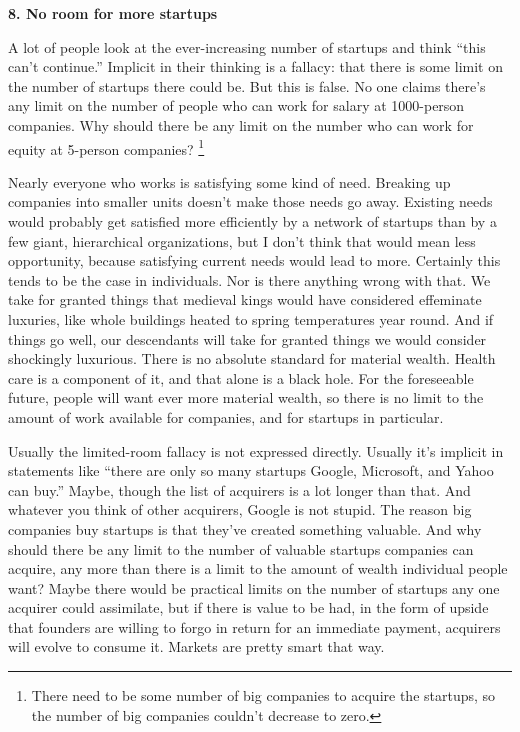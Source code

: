 \documentclass[12pt]{book}
\begin{document}
\textbf{8. No room for more startups}

A lot of people look at the ever-increasing number of startups and think
``this can't continue.'' Implicit in their thinking is a fallacy: that
there is some limit on the number of startups there could be. But this
is false. No one claims there's any limit on the number of people who
can work for salary at 1000-person companies. Why should there be any
limit on the number who can work for equity at 5-person companies?
\footnote{There need to be some number of big companies to acquire the
startups, so the number of big companies couldn't decrease to zero.}

Nearly everyone who works is satisfying some kind of need. Breaking up
companies into smaller units doesn't make those needs go away. Existing
needs would probably get satisfied more efficiently by a network of
startups than by a few giant, hierarchical organizations, but I don't
think that would mean less opportunity, because satisfying current needs
would lead to more. Certainly this tends to be the case in individuals.
Nor is there anything wrong with that. We take for granted things that
medieval kings would have considered effeminate luxuries, like whole
buildings heated to spring temperatures year round. And if things go
well, our descendants will take for granted things we would consider
shockingly luxurious. There is no absolute standard for material wealth.
Health care is a component of it, and that alone is a black hole. For
the foreseeable future, people will want ever more material wealth, so
there is no limit to the amount of work available for companies, and for
startups in particular.

Usually the limited-room fallacy is not expressed directly. Usually it's
implicit in statements like ``there are only so many startups Google,
Microsoft, and Yahoo can buy.'' Maybe, though the list of acquirers is a
lot longer than that. And whatever you think of other acquirers, Google
is not stupid. The reason big companies buy startups is that they've
created something valuable. And why should there be any limit to the
number of valuable startups companies can acquire, any more than there
is a limit to the amount of wealth individual people want? Maybe there
would be practical limits on the number of startups any one acquirer
could assimilate, but if there is value to be had, in the form of upside
that founders are willing to forgo in return for an immediate payment,
acquirers will evolve to consume it. Markets are pretty smart that way.
\end{document}
